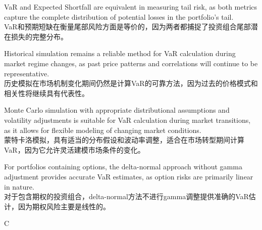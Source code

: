 \documentclass{article}
\begin{document}
\begin{choices}
    \item VaR and Expected Shortfall are equivalent in measuring tail risk, as both metrics capture the complete distribution of potential losses in the portfolio's tail.\\
    VaR和预期短缺在衡量尾部风险方面是等价的，因为两者都捕捉了投资组合尾部潜在损失的完整分布。
    
    \item Historical simulation remains a reliable method for VaR calculation during market regime changes, as past price patterns and correlations will continue to be representative.\\
    历史模拟在市场机制变化期间仍然是计算VaR的可靠方法，因为过去的价格模式和相关性将继续具有代表性。
    
    \item Monte Carlo simulation with appropriate distributional assumptions and volatility adjustments is suitable for VaR calculation during market transitions, as it allows for flexible modeling of changing market conditions.\\
    蒙特卡洛模拟，具有适当的分布假设和波动率调整，适合在市场转型期间计算VaR，因为它允许灵活建模市场条件的变化。
    
    \item For portfolios containing options, the delta-normal approach without gamma adjustment provides accurate VaR estimates, as option risks are primarily linear in nature.\\
    对于包含期权的投资组合，delta-normal方法不进行gamma调整提供准确的VaR估计，因为期权风险主要是线性的。
\end{choices}

\begin{correctanswer}
    C
\end{correctanswer}
\end{document}
